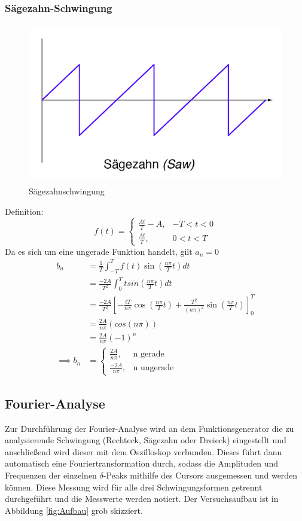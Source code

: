 \subsubsection{Sägezahn-Schwingung}
\begin{figure}[h]
  \centering
  \includegraphics[height=7cm]{Saegezahn.png}
  \caption{Sägezahnschwingung \cite{Schwingungen}}
  \label{fig:säge}
\end{figure}
Definition:
\begin{equation}
  f(t)= \begin{cases}
        \frac{At}{T} - A  , & -T < t < 0 \\
        \frac{At}{T} , & 0 < t < T
      \end{cases}
\end{equation}
Da es sich um eine ungerade Funktion handelt, gilt $a_n = 0 $
\begin{align*}
  b_n &= \frac{1}{T} \int_{-T}^T f(t) \sin (\frac{n\pi}{T}t) dt \\
  &= \frac{-2A}{T^2} \int_0^T tsin( \frac{n\pi}{T}t) dt \\
  &= \frac{-2A}{T^2} [- \frac{tT}{n\pi} \cos (\frac{n\pi}{T}t)
  +\frac{T^2}{(n\pi)^2} \sin (\frac{n\pi}{T}t)]_0^T \\
  &= \frac{2A}{n\pi}(cos(n\pi)) \\
  &= \frac{2A}{n\pi}(-1)^n \\
  \implies b_n &= \begin{cases}
        \frac{2A}{n\pi}  , &\text{n gerade} \\
        \frac{-2A}{n\pi}  , &\text{n ungerade}
      \end{cases}
\end{align*}

\subsection{Fourier-Analyse}
Zur Durchführung der Fourier-Analyse wird an dem Funktionsgenerator
die zu analysierende Schwingung (Rechteck, Sägezahn
oder Dreieck) eingestellt und anschließend wird dieser
mit dem Oszilloskop verbunden. Dieses führt dann automatisch eine
Fouriertransformation durch, sodass die Amplituden und Frequenzen der einzelnen
$\delta$-Peaks mithilfe des Cursors ausgemessen und werden können. Diese Messung
wird für alle drei Schwingungsformen getrennt durchgeführt und die Messwerte
werden notiert. Der Versuchsaufbau ist in Abbildung \ref{fig:Aufbau} grob
skizziert.

